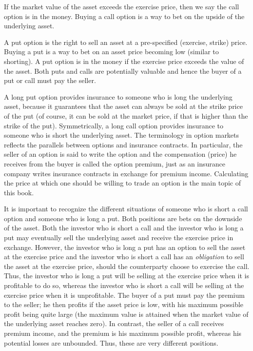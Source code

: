 If the market value of the asset exceeds the exercise price, then we say the call option is in the money.  Buying a call option is a way to bet on the upside of the underlying asset.  

A put option  is the right to sell an asset at a pre-specified (exercise, strike) price.  Buying a put is a way to bet on an asset price becoming low (similar to shorting).  A put option is in the money if the exercise price exceeds the value of the asset.  Both puts and calls are potentially valuable and hence the buyer of a put or call must pay the seller.  

A long put option provides insurance to someone who is long the underlying asset, because it guarantees that the asset can always be sold at the strike price of the put (of course, it can be sold at the market price, if that is higher than the strike of the put).  Symmetrically, a long call option provides insurance to someone who is short the underlying asset. The terminology in option markets reflects the parallels between options and insurance contracts.  In particular, the seller of an option is said to write the option and the compensation (price) he receives from the buyer is called the option premium,  just as an insurance company writes insurance contracts in exchange for premium income.  Calculating the price at which one should be willing to trade an option is the main topic of this book.

It is important to recognize the different situations of someone who is short a call option and someone who is long a put.  Both positions are bets on the downside of the asset.  Both the investor who is short a call and the investor who is long a put may eventually sell the underlying asset  and receive the exercise price in exchange.  However, the investor who is long a put has an option to sell the asset at the exercise price and the investor who is short a call has an \emph{obligation} to sell the asset at the exercise price, should the counterparty choose to exercise the call.  Thus, the investor who is long a put will be selling at the exercise price when it is profitable to do so, whereas the investor who is short a call will be selling at the exercise price when it is unprofitable.  The buyer of a put must pay the premium to the seller; he then profits if the asset price is low, with his maximum possible profit being quite large (the maximum value is attained when the market value of the underlying asset reaches zero).  In contrast, the seller of a call receives premium income, and the premium is his maximum possible profit, whereas his potential losses are unbounded.  Thus, these are very different positions.

